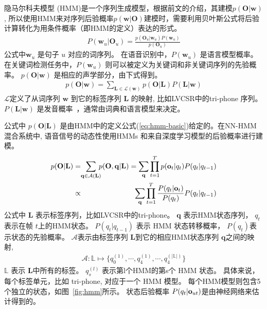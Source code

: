 隐马尔科夫模型 (HMM)是一个序列生成模型，根据前文的介绍，其建模$p(\mathbf{O}|\mathbf{w})$, 所以使用HMM来对序列后验概率$p(\mathbf{w}|\mathbf{O})$建模时，需要利用贝叶斯公式将后验计算转化为用条件概率（即HMM的定义）表达的形式。
\begin{equation}
\label{equ:map-dec}
\begin{split}
P(\mathbf{w}_u|\mathbf{O}_u)=\frac {p(\mathbf{O}_u|\mathbf{w}_u)P(\mathbf{w}_u)}{p(\mathbf{O}_u)}  
\end{split}
\end{equation}
公式中$\mathbf{w}_u$ 是句子 $u$ 对应的词序列。 在语音识别中，$P(\mathbf{w}_u)$ 是语言模型概率。在关键词检测任务中，$P(\mathbf{w}_u)$ 则可以被定义为关键词和非关键词序列的先验概率。
$p(\mathbf{O}|\mathbf{w})$ 是相应的声学部分，由下式得到。
\begin{equation}
\label{equ:lexicon}
\begin{split}
p(\mathbf{O}|\mathbf{w})=\sum_{\mathbf{L}\in\mathcal{L}(\mathbf{w})} p(\mathbf{O}|\mathbf{L})P(\mathbf{L}|\mathbf{w})
\end{split}
\end{equation}
$\mathcal{L}$定义了从词序列 $\mathbf{w}$ 到它的标签序列 $\mathbf{L}$ 的映射, 比如LVCSR中的tri-phone 序列。 $P(\mathbf{L}|\mathbf{w})$ 是发音概率~\cite{chen2015pronunciation}，通常由词典和语言模型来决定。

公式中 $p(\mathbf{O}|\mathbf{L})$ 是由HMM中的定义公式(\ref{eq:hmm-basic})给定的。在NN-HMM 混合系统中, 语音信号的动态性使用HMMs 和来自深度学习模型的后验概率进行建模。
\begin{eqnarray}
\label{equ:hmm-model_2}
p(\mathbf{O}|\mathbf{L})&=&\!\!\!\!\!\!\sum_{\mathbf{q}\in\mathcal{A}(\mathbf{L})}\!\!\!p(\mathbf{O},\mathbf{q}|{\mathbf L}) =\sum_{\mathbf{q}}\prod_{t=1}^{T} p({\bf o}_{t}|q_t) P(q_t|q_{t-1})\nonumber\\
&\propto&\sum_{\mathbf{q}}\prod_{t=1}^{T} \frac{P(q_t|{\bf o}_{t})}{P(q_t)}P(q_t|q_{t-1})
\end{eqnarray}
公式中 $\mathbf{L}$ 表示标签序列，比如LVCSR中的tri-phone。
$\mathbf{q}$ 表示HMM状态序列，  $q_t$ 表示在帧 $t$上的HMM状态。 $P(q_t|q_{t-1})$ 表示 HMM 状态转移概率， $P(q_t)$表示状态的先验概率。
$\mathcal{A}$表示由标签序列 $\mathbf{L}$到它的相应HMM状态序列 $\mathbf{q}$之间的映射,
\begin{equation}
\label{equ:a-func_2}
\begin{split}
\mathcal{A}:\mathbb{L}  \mapsto \{ q_0^{(1)},\cdots,q_4^{(1)},\cdots,q_4^{(|\mathbb{L}|)} \}
\end{split}
\end{equation}
$\mathbb{L}$ 表示 $\mathbf{L}$中所有的标签。 $q_s^{(l)}$ 表示第l个HMM的第s个 HMM 状态。
具体来说，每个标签单元，比如 tri-phone, 对应于一个 HMM 模型。
每个HMM模型则包含5个独立的状态，如图~\ref{fig:hmm}所示。
状态后验概率 $P(q_t|{\bf o}_{ut})$是由神经网络来估计得到的。


